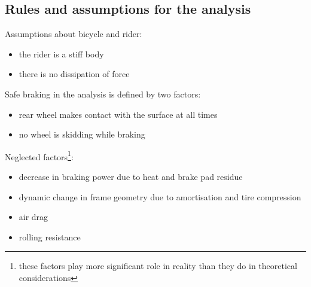 \documentclass[12pt]{article}
\begin{document}
\subsection{Rules and assumptions for the analysis}
Assumptions about bicycle and rider:
\begin{itemize}
\item{the rider is a stiff body}
\item{there is no dissipation of force}
\end{itemize}
Safe braking in the analysis is defined by two factors:
\begin{itemize}
\item{rear wheel makes contact with the surface at all times}
\item{no wheel is skidding while braking}
\end{itemize}
Neglected factors\footnote[1]{these factors play more significant role in reality than they do in theoretical
considerations}:
\begin{itemize}
\item{decrease in braking power due to heat and brake pad residue}
\item{dynamic change in frame geometry due to amortisation and tire compression}
\item{air drag}
\item{rolling resistance}
\end{itemize}
\newpage
\end{document}
